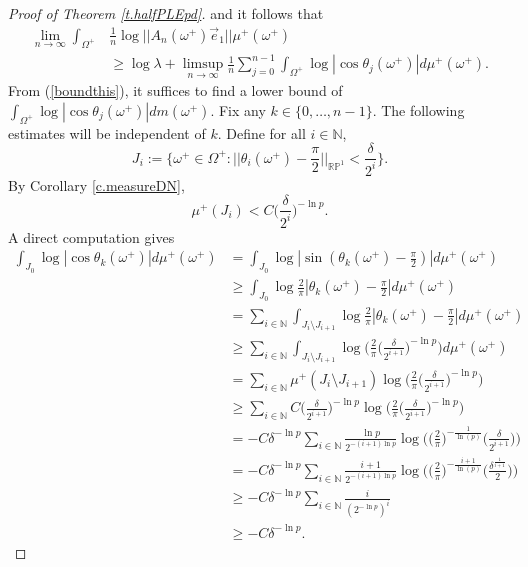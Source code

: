 \documentclass{amsart}
\newcommand{\NN}{\mathbb{N}}
\newcommand{\PP}{\mathbb{P}}
\newcommand{\RR}{\mathbb{R}}
\begin{document}
\begin{proof}[Proof of Theorem \ref{t.halfPLEpd}]
    and it follows that
    \begin{align}
        \lim_{n\rightarrow \infty} \int_{\Omega^+}& \frac{1}{n}\log ||A_n(\omega^+)\vec{e}_1|| \mu^+(\omega^+)\nonumber\\
        &\geq \log \lambda + \limsup_{n\rightarrow \infty}\frac{1}{n}\sum_{j=0}^{n-1} \int_{\Omega^+} \log|\cos\theta_j(\omega^+)| d\mu^+(\omega^+).\label{boundthis}
    \end{align}
    From (\ref{boundthis}), it suffices to find a lower bound of $\int_{\Omega^+} \log|\cos\theta_j(\omega^+)| dm(\omega^+)$.
    Fix any $k \in \{0,\dots, n-1\}$. The following estimates will be independent of $k$. Define for all $i\in \NN$,
    \[J_i := \{\omega^+\in \Omega^+: ||\theta_i(\omega^+) - \frac{\pi}{2}||_{\RR\PP^1}< \frac{\delta}{2^i}\}.\]
    By Corollary \ref{c.measureDN},
    \[\mu^+(J_i) < C\Big(\frac{\delta}{2^i}\Big)^{- \ln p}.\]
    A direct computation gives
    \begin{align*}
        \int_{J_0} \log|\cos\theta_k(\omega^+)|d\mu^+(\omega^+) &= \int_{J_0} \log|\sin(\theta_k(\omega^+) - \frac{\pi}{2})|d\mu^+(\omega^+) \\
        &\geq \int_{J_0} \log\frac{2}{\pi}|\theta_k(\omega^+) - \frac{\pi}{2}|d\mu^+(\omega^+) \\
        &= \sum_{i\in \NN} \int_{J_i\setminus J_{i+1}} \log\frac{2}{\pi}|\theta_k(\omega^+) - \frac{\pi}{2}|d\mu^+(\omega^+)\\
        &\geq \sum_{i\in \NN} \int_{J_i\setminus J_{i+1}} \log\Bigg(\frac{2}{\pi}\Big(\frac{\delta}{2^{i+1}}\Big)^{- \ln p}\Bigg)d\mu^+(\omega^+)\\
        &= \sum_{i\in \NN} \mu^+(J_i\setminus J_{i+1}) \log\Bigg(\frac{2}{\pi}\Big(\frac{\delta}{2^{i+1}}\Big)^{- \ln p}\Bigg)\\ 
        &\geq \sum_{i\in \NN}  C\Big(\frac{\delta}{2^{i+1}}\Big)^{- \ln p}\log\Bigg(\frac{2}{\pi}\Big(\frac{\delta}{2^{i+1}}\Big)^{- \ln p}\Bigg)\\
        &= -C\delta^{-\ln p} \sum_{i\in \NN} \frac{\ln p}{2^{-(i+1)\ln p}} \log\Bigg(\Big(\frac{2}{\pi}\Big)^{-\frac{1}{\ln(p)}}\Big(\frac{\delta}{2^{i+1}}\Big)\Bigg) \\
        &= -C\delta^{-\ln p} \sum_{i\in \NN} \frac{i+1}{2^{-(i+1)\ln p}} \log\Bigg(\Big(\frac{2}{\pi}\Big)^{-\frac{i+1}{\ln(p)}}\Big(\frac{\delta^{\frac{1}{i+1}}}{2}\Big)\Bigg) \\
        &\geq -C\delta^{-\ln p}\sum_{i\in \NN} \frac{i}{(2^{-\ln p})^i}\\
        &\geq -C\delta^{-\ln p}.

\end{align*}
\end{proof}
\end{document}

